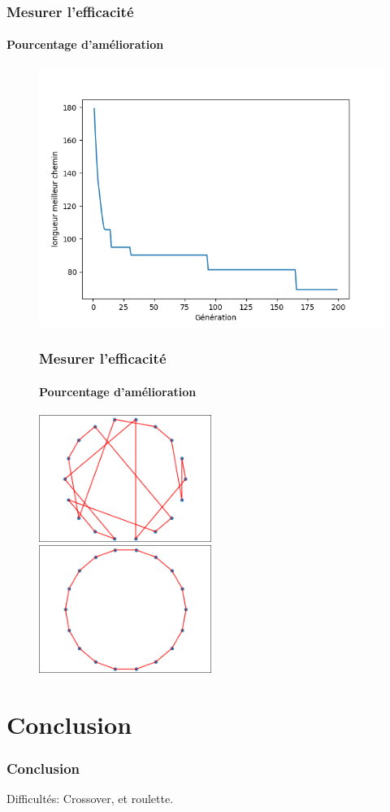 \documentclass[16pt]{beamer}
\begin{document}
\begin{frame}
  \frametitle{Mesurer l'efficacité}
  \framesubtitle{Pourcentage d'amélioration}
  \begin{figure}
    \includegraphics[scale=0.5]{evol.png}
  \end{figure}
\end{frame}

\begin{frame}
  \begin{figure}
  \frametitle{Mesurer l'efficacité}
  \framesubtitle{Pourcentage d'amélioration}
    \includegraphics[width=0.5\textwidth]{gen1.png}
    \includegraphics[width=0.5\textwidth]{gen200.png}
  \end{figure}
\end{frame}

\section{Conclusion}

\begin{frame}
  \frametitle{Conclusion}
  \pause{}
  Difficultés: Crossover, et roulette.
\end{frame}
\end{document}

